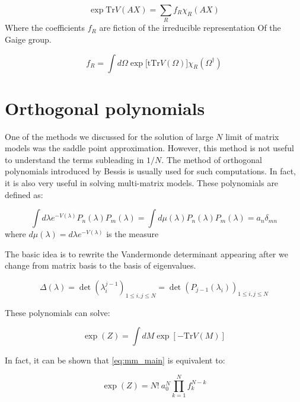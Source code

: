 \documentclass[11pt]{article}
\begin{document}
\begin{equation}
\exp \mbox{Tr} V(AX) = \sum_{R} f_{R} \chi_{R}(AX) 
\end{equation}
Where the coefficients $f_{R}$ are fiction of the irreducible representation 
Of the Gaige group. 

\begin{equation}
f_{R} = \int d\Omega \exp \Big[ \mbox{tTr} V(\Omega)\Big] \chi_{R}(\Omega^\dagger) 
\end{equation}





\section{Orthogonal polynomials}
One of the methods we discussed for the solution of 
large $N$ limit of matrix models was the saddle point approximation. 
However, this method is not useful 
to understand the terms subleading in $1/N$. The method 
of orthogonal polynomials introduced by Bessis \cite{Bessis:1979is} 
is usually used for such computations. In fact, it is also very useful in 
solving multi-matrix models. These polynomials are defined as:

\begin{equation}
	\label{eq:ortho_nn} 
	\int d\lambda e^{-V(\lambda)} P_{n}(\lambda)
	P_{m}(\lambda) = \int d \mu(\lambda) P_{n}(\lambda)
	P_{m}(\lambda) = a_{n} \delta_{mn} 
\end{equation}
where $d \mu(\lambda) = d\lambda e^{-V(\lambda)}$ is the measure  

The basic idea is to rewrite the Vandermonde determinant appearing after we change from matrix basis to the basis of eigenvalues. 

\begin{equation}
	\Delta(\lambda) = \det(\lambda_{i}^{j-1})_{1 \le i, j \le N} = \det(P_{j-1}(\lambda_i))_{1 \le i, j \le N}
\end{equation}


These polynomials can solve:

\begin{equation}
	\label{eq:mm_main}
	\exp(Z) = \int dM \exp[-\mbox{Tr} V(M)] 
\end{equation}

In fact, it can be shown that \ref{eq:mm_main} is equivalent to:

\begin{equation}
	\exp(Z) = N! ~ a_{0}^{N} \prod_{k=1}^{N} f_{k}^{N-k}
\end{equation}
\end{document}
